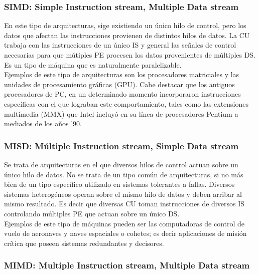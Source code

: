 \subsubsection{SIMD: Simple Instruction stream, Multiple Data stream}
\label{subsubsec:theory-modern-flynn_taxonomy-SIMD}

En este tipo de arquitecturas, sige existiendo un único hilo de control, pero 
los datos que afectan las instrucciones provienen de distintos hilos de datos. 
La CU trabaja con las instrucciones de un único IS y general las señales de 
control necesarias para que mútiples PE procesen los datos provenientes de 
múltiples DS. Es un tipo de máquina que es naturalmente paralelizable.\\
Ejemplos de este tipo de arquitecturas son los procesadores matriciales y las 
unidades de procesamiento gráficas (GPU). Cabe destacar que los antiguos 
procesadores de PC, en un determinado momento incorporaron instrucciones 
específicas con el que lograban este comportamiento, tales como las extensiones 
multimedia (MMX) que Intel incluyó en su línea de procesadores Pentium a 
mediados de los años '90.

\subsubsection{MISD: Múltiple Instruction stream, Simple Data stream}
\label{subsubsec:theory-modern-flynn_taxonomy-MISD}

Se trata de arquitecturas en el que diversos hilos de control actuan sobre un 
único hilo de datos. No se trata de un tipo común de arquitecturas, si no más 
bien de un tipo específico utilizado en sistemas tolerantes a fallas. Diversos 
sistemas heterogéneos operan sobre el mismo hilo de datos y deben arribar al 
mismo resultado. Es decir que diversas CU toman instrucciones de diversos IS 
controlando múltiples PE que actuan sobre un único DS.\\
Ejemplos de este tipo de máquinas pueden ser las computadoras de control de 
vuelo de aeronaves y naves espaciales o cohetes; es decir aplicaciones de 
misión crítica que poseen sistemas redundantes y decisores.

\subsubsection{MIMD: Multiple Instruction stream, Multiple Data stream}
\label{subsubsec:theory-modern-flynn_taxonomy-MIMD}

